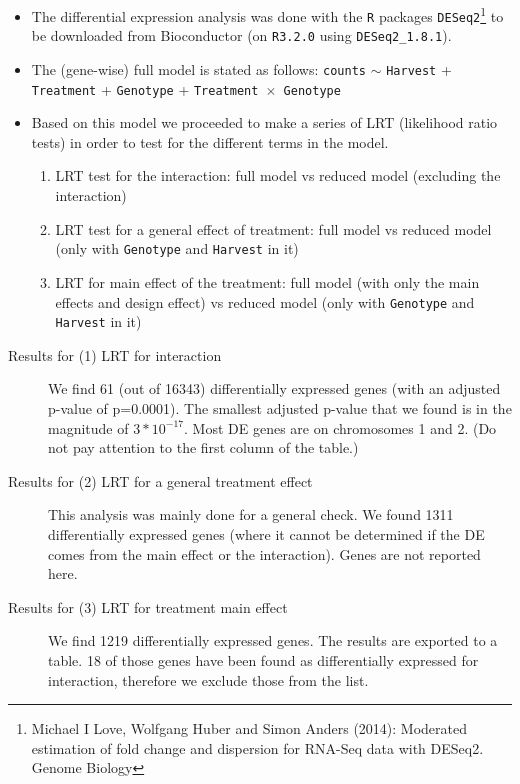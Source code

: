 \documentclass[12pt, a4paper]{article}
\begin{document}
\begin{itemize}

\item The differential expression analysis was done with the \texttt{R} packages \texttt{DESeq2}\footnote{Michael I Love, Wolfgang Huber and Simon Anders (2014): Moderated estimation of fold change and dispersion 
for RNA-Seq  data with DESeq2. Genome Biology} 
to be downloaded from Bioconductor (on \texttt{R3.2.0} using \texttt{DESeq2\_1.8.1}). 

\item The (gene-wise) full model is stated as follows: 
\newline \texttt{counts} $\sim$ \texttt{Harvest} + \texttt{Treatment} + \texttt{Genotype} + \texttt{Treatment $\times$ Genotype}

\item Based on this model we proceeded to make a series of LRT (likelihood ratio tests) in order to test for 
the different terms in the model.
	\begin{enumerate}
	\item LRT test for the interaction: full model vs reduced model (excluding the interaction)
	\item LRT test for a general effect of treatment: full model vs reduced model (only with \texttt{Genotype} and \texttt{Harvest} in it)
	\item LRT for main effect of the treatment: full model (with only the main effects and design effect) vs reduced model (only with \texttt{Genotype} and \texttt{Harvest} in it)
	\end{enumerate}

\end{itemize}

\begin{description}
\item[Results for (1) LRT for interaction]
	We find 61 (out of 16343) differentially expressed genes (with an adjusted p-value of p=0.0001). The smallest 
	adjusted p-value that we found is in the magnitude of $3*10^{-17}$.  Most DE genes are on chromosomes 1 and 2. (Do not pay attention to the first column of the table.)
\item[Results for (2) LRT for a general treatment effect] 
	This analysis was mainly done for a general check. We found 1311 differentially expressed genes (where it 
	cannot be determined if the DE comes from the main effect or the interaction). Genes are not reported here.
\item[Results for (3) LRT for treatment main effect] 
	We find 1219 differentially expressed genes. The results are exported to a table. 18 of those genes have been 
	found as differentially expressed for interaction, therefore we exclude those from the list.	
\end{description}
\end{document}
